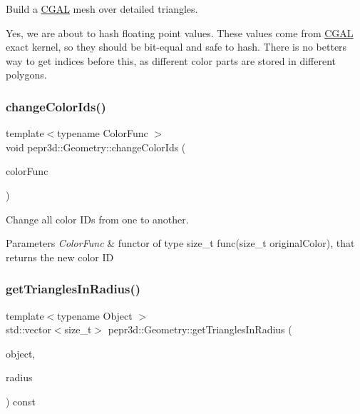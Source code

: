 Build a \mbox{\hyperlink{namespace_c_g_a_l}{C\+G\+AL}} mesh over detailed triangles. 

Yes, we are about to hash floating point values. These values come from \mbox{\hyperlink{namespace_c_g_a_l}{C\+G\+AL}} exact kernel, so they should be bit-\/equal and safe to hash. There is no betters way to get indices before this, as different color parts are stored in different polygons.\mbox{\label{classpepr3d_1_1_geometry_ae6d2ae86fca37592a5dbb93784ca4ef0}} 
\subsubsection{\texorpdfstring{changeColorIds()}{changeColorIds()}}
{\footnotesize\ttfamily template$<$typename Color\+Func $>$ \\
void pepr3d\+::\+Geometry\+::change\+Color\+Ids (\begin{DoxyParamCaption}\item[{const Color\+Func \&}]{color\+Func }\end{DoxyParamCaption})\hspace{0.3cm}{\ttfamily [inline]}}



Change all color ID\textquotesingle{}s from one to another. 


\begin{DoxyParams}{Parameters}
{\em Color\+Func} & functor of type size\+\_\+t func(size\+\_\+t original\+Color), that returns the new color ID \\
\hline
\end{DoxyParams}
\mbox{\label{classpepr3d_1_1_geometry_a4907bc6f193156a3d68956b2ce622120}} 
\subsubsection{\texorpdfstring{getTrianglesInRadius()}{getTrianglesInRadius()}}
{\footnotesize\ttfamily template$<$typename Object $>$ \\
std\+::vector$<$size\+\_\+t$>$ pepr3d\+::\+Geometry\+::get\+Triangles\+In\+Radius (\begin{DoxyParamCaption}\item[{const Object \&}]{object,  }\item[{double}]{radius }\end{DoxyParamCaption}) const\hspace{0.3cm}{\ttfamily [inline]}}



